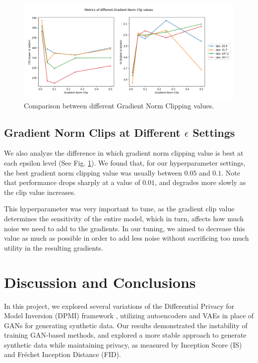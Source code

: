 \documentclass{article}
\begin{document}
\begin{figure}[!h]
    \centering
    \includegraphics[width=0.9\columnwidth]{images/c_p.png}
    \caption{Comparison between different Gradient Norm Clipping values.}
    \label{fig:clip}
\end{figure}


\subsection{Gradient Norm Clips at Different $\epsilon$ Settings}
We also analyze the difference in which gradient norm clipping value is best at each epsilon level (See Fig. \ref{fig:clip}). We found that, for our hyperparameter settings, the best gradient norm clipping value was usually between $0.05$ and $0.1$. Note that performance drops sharply at a value of $0.01$, and degrades more slowly as the clip value increases. 

This hyperparameter was very important to tune, as the gradient clip value determines the sensitivity of the entire model, which in turn, affects how much noise we need to add to the gradients. In our tuning, we aimed to decrease this value as much as possible in order to add less noise without sacrificing too much utility in the resulting gradients. 





\section{Discussion and Conclusions}
In this project, we explored several variations of the Differential Privacy for Model Inversion (DPMI) framework \cite{dpmi}, utilizing autoencoders and VAEs in place of GANs for generating synthetic data. Our results demonstrated the instability of training GAN-based methods, and explored a more stable approach to generate synthetic data while maintaining privacy, as measured by Inception Score (IS) and Fréchet Inception Distance (FID).
\end{document}
